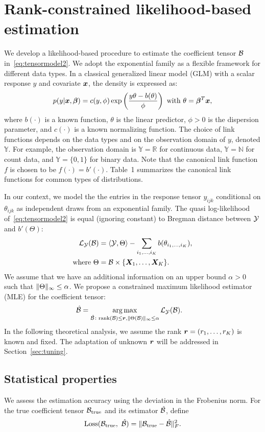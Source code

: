 \documentclass[12pt]{article}
\theoremstyle{plain}
\theoremstyle{definition}
\begin{document}
\section{Rank-constrained likelihood-based estimation}
We develop a likelihood-based procedure to estimate the coefficient tensor $\mathcal{B}$ in~\eqref{eq:tensormodel2}. We adopt the exponential family as a flexible framework for different data types. In a classical generalized linear model (GLM) with a scalar response $y$ and covariate $\bm x$, the density is expressed as:
\[
p(y|\bm x, \boldsymbol{\beta})=c(y,\phi)\exp\left({y\theta- b(\theta) \over \phi}\right)\ \text{with}\ \theta=\boldsymbol{\beta}^T\bm x,
\]
where $b(\cdot)$ is a known function, $\theta$ is the linear predictor, $\phi>0$ is the dispersion parameter, and $c(\cdot)$ is a known normalizing function. The choice of link functions depends on the data types and on the observation domain of $y$, denoted $\mathbb{Y}$. For example, the observation domain is $\mathbb{Y}=\mathbb{R}$ for continuous data, $\mathbb{Y}=\mathbb{N}$ for count data, and  $\mathbb{Y}=\{0,1\}$ for binary data. 
Note that the canonical link function $f$ is chosen to be $f(\cdot)=b'(\cdot)$. Table~1 summarizes the canonical link functions for common types of distributions. 

In our context, we model the the entries in the response tensor $y_{ijk}$ conditional on $\theta_{ijk}$ as independent draws from an exponential family. The quasi log-likelihood of~\eqref{eq:tensormodel2} is equal (ignoring constant) to Bregman distance between $\mathcal{Y}$ and $b'(\Theta)$:
\begin{align}
\mathcal{L}_{\mathcal{Y}}(\mathcal{B})&=\langle \mathcal{Y}, \Theta \rangle - \sum_{i_1,\ldots,i_K} b(\theta_{i_1,\ldots,i_K}),\\
\text{where}\ \Theta&=\mathcal{B}\times\{\bm X_1,\ldots,\bm X_K\}.
\end{align}
We assume that we have an additional information on an upper bound $\alpha>0$ such that $\lVert\Theta\rVert_\infty\leq \alpha$. We propose a constrained maximum likelihood estimator (MLE) for the coefficient tensor:
\begin{align} \label{eq:MLE} 
	\hat {\mathcal{B}} &=\operatorname*{arg\,max}_{\hat {\mathcal{B}} \colon \text{rank}(\mathcal{B})\leq \bm{r}, \lVert\Theta(\mathcal{B})\rVert_\infty\leq \alpha  } \mathcal{L}_{\mathcal{Y}}(\mathcal{B}).
\end{align}
In the following theoretical analysis, we assume the rank $\bm{r}=(r_1,\ldots,r_K)$ is known and fixed. The adaptation of unknown $\bm{r}$ will be addressed in Section~\ref{sec:tuning}. 


\subsection{Statistical properties}\label{subsec:statprob}
We assess the estimation accuracy using the deviation in the Frobenius norm. For the true coefficient tensor $\mathcal{B}_{\text{true}}$ and its estimator $\hat {\mathcal{B}}$, define
\[
\text{Loss}(\mathcal{B}_{\text{true}},\ \hat {\mathcal{B}})=\lVert\mathcal{B}_{\text{true}}- \hat {\mathcal{B}}\rVert_F^2.
\]
\end{document}
